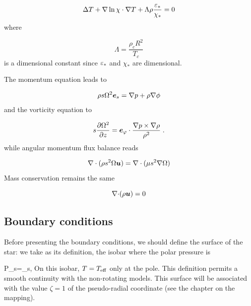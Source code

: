\begin{equation} \Delta T + \nabla\ln\chi\cdot\nabla T +
\Lambda\rho\frac{\varepsilon_*}{\chi_*} = 0\end{equation}
where

\begin{equation} \Lambda = \frac{\rho_c R^2}{T_c}\end{equation}
is a dimensional constant since $\varepsilon_*$ and $\chi_*$ are dimensional. 

The momentum equation leads to

\begin{equation}
\rho s\Omega^2\es=\na p+\rho\na\phi
\label{barocnd}
\end{equation}
and the vorticity equation to

\begin{equation}
s\frac{\partial\Omega^2}{\partial z}=\ephi\cdot\frac{\na
p\times\na\rho}{\rho^2} \;.
\end{equation}
while angular momentum flux balance reads

\begin{equation}
\label{eq:angular_momnd}
\na\cdot{(\rho s^2\Omega\vu)}=\na\cdot (\mu s^2\na\Omega)
\end{equation}
Mass conservation remains the same

\begin{equation} \Div(\rho\vu) =0\end{equation}

\subsection{Boundary conditions}

Before presenting the boundary conditions, we should define the surface
of the star: we take as its definition, the isobar where the polar
pressure is 

\beq P_s=\tau_s,\eeq
On this isobar, $T=T_{\rm eff}$ only at the pole. This definition
permits a smooth continuity with the non-rotating models. This surface
will be associated with the value $\zeta=1$ of the pseudo-radial
coordinate (see the chapter on the mapping).

